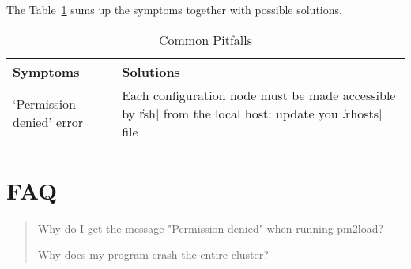 The Table~\ref{tbl:pitfalls} sums up the symptoms together with
possible solutions.
\begin{table}
\caption{Common Pitfalls\label{tbl:pitfalls}}
\begin{center}
\begin{tabular}{|p{5cm}|p{7cm}|}                             \hline
Symptoms                       & Solutions                    \\ \hline
`Permission denied' error      & Each configuration node must be made
accessible by \|rsh| from the local host: update you
\|.rhosts| file                                         \\ \hline
\end{tabular}
\end{center}
\end{table}

\section{FAQ}
\label{sec:faq}
\begin{quote}
  Why do I get the message "Permission denied" when running pm2load?
  
  Why does my program crash the entire cluster?
\end{quote}
